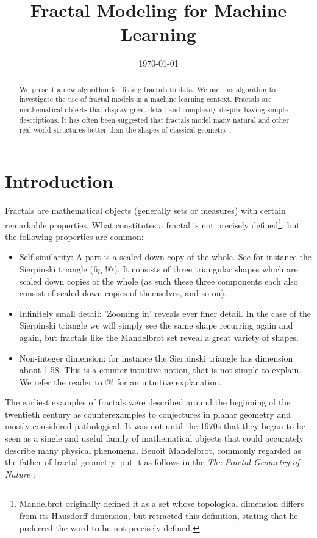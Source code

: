 \documentclass[11pt]{article}
\title{Fractal Modeling for Machine Learning}
\date{\today}
\theoremstyle{definition}
\begin{document}
\maketitle

\begin{abstract}
\noindent We present a new algorithm for fitting fractals to data. We use this algorithm to investigate the use of fractal models in a machine learning context. Fractals are mathematical objects that display great detail and complexity despite having simple descriptions. It has often been suggested that fractals model many natural and other real-world structures better than the shapes of classical geometry \cite{mandelbrot1982fractal}.
\end{abstract}


\section{Introduction}

Fractals are mathematical objects (generally sets or measures) with certain remarkable properties. What constitutes a fractal is not precisely defined\footnote{Mandelbrot originally defined it as a set whose topological dimension differs from its Hausdorff dimension, but retracted this definition, stating that he preferred the word to be not precisely defined.}, but the following properties are common:

\begin{itemize}
  \item Self similarity: A part is a scaled down copy of the whole. See for instance the Sierpinski triangle (fig !@). It consists of three triangular shapes which are scaled down copies of the whole (as such these three components each also consist of scaled down copies of themselves, and so on).
  \item Infinitely small detail: 'Zooming in' reveals ever finer detail. In the case of the Sierpinski triangle we will simply see the same shape recurring again and again, but fractals like the Mandelbrot set reveal a great variety of shapes.
  \item Non-integer dimension: for instance the Sierpinski triangle has dimension about 1.58. This is a counter intuitive notion, that is not simple to explain. We refer the reader to @! for an intuitive explanation.
\end{itemize}

The earliest examples of fractals were described around the beginning of the twentieth century as counterexamples to conjectures in planar geometry and mostly considered pathological. It was not until the 1970s that they began to be seen as a single and useful family of mathematical objects that could accurately describe many physical phenomena. Beno\^it Mandelbrot, commonly regarded as the father of fractal geometry, put it as follows in the \emph{The Fractal Geometry of Nature} \cite{mandelbrot1982fractal}:
\end{document}
